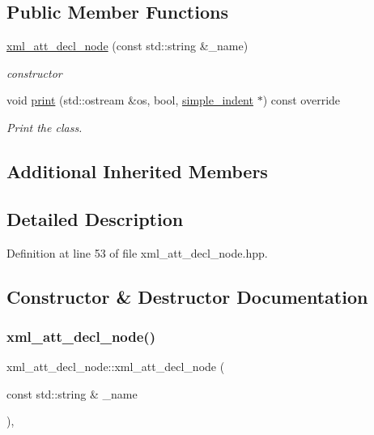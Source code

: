 \subsection*{Public Member Functions}
\begin{DoxyCompactItemize}
\item 
\hyperlink{structxml__att__decl__node_a41c4face8202dfadec3db560d3985d2b}{xml\+\_\+att\+\_\+decl\+\_\+node} (const std\+::string \&\+\_\+name)
\begin{DoxyCompactList}\small\item\em constructor \end{DoxyCompactList}\item 
void \hyperlink{structxml__att__decl__node_a600970122689d8a18739cf36b1b8698d}{print} (std\+::ostream \&os, bool, \hyperlink{classsimple__indent}{simple\+\_\+indent} $\ast$) const override
\begin{DoxyCompactList}\small\item\em Print the class. \end{DoxyCompactList}\end{DoxyCompactItemize}
\subsection*{Additional Inherited Members}


\subsection{Detailed Description}


Definition at line 53 of file xml\+\_\+att\+\_\+decl\+\_\+node.\+hpp.



\subsection{Constructor \& Destructor Documentation}
\mbox{\label{structxml__att__decl__node_a41c4face8202dfadec3db560d3985d2b}} 
\subsubsection{\texorpdfstring{xml\+\_\+att\+\_\+decl\+\_\+node()}{xml\_att\_decl\_node()}}
{\footnotesize\ttfamily xml\+\_\+att\+\_\+decl\+\_\+node\+::xml\+\_\+att\+\_\+decl\+\_\+node (\begin{DoxyParamCaption}\item[{const std\+::string \&}]{\+\_\+name }\end{DoxyParamCaption})\hspace{0.3cm}{\ttfamily [inline]}, {\ttfamily [explicit]}}



